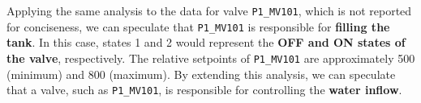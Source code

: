 \bigskip
Applying the same analysis to the data for valve \texttt{P1\_MV101}, which is not reported for conciseness, we can speculate that \texttt{P1\_MV101} is responsible for \textbf{filling the tank}. In this case, states 1 and 2 would represent the \textbf{OFF and ON states of the valve}, respectively. The relative setpoints of \texttt{P1\_MV101} are approximately 500 (minimum) and 800 (maximum).\newline
By extending this analysis, we can speculate that a valve, such as \texttt{P1\_MV101}, is responsible for controlling the \textbf{water inflow}.


		
				
		
		
		
		
		
		
